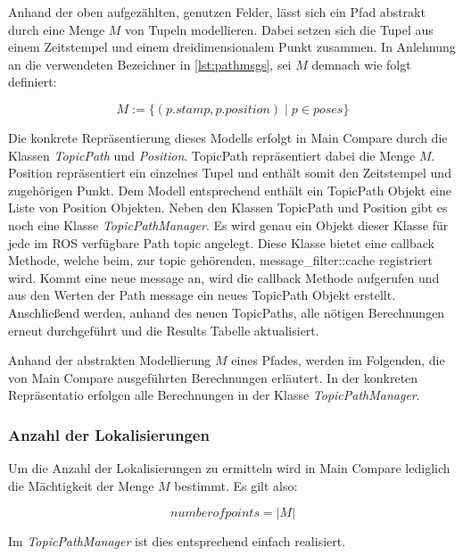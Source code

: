 Anhand der oben aufgezählten, genutzen Felder, lässt sich ein Pfad abstrakt durch eine Menge
$M$ von Tupeln modellieren. Dabei setzen sich die Tupel aus einem Zeitstempel und einem dreidimensionalem
Punkt zusammen. In Anlehnung an die verwendeten Bezeichner in
\autoref{lst:pathmsgs}, sei $M$ demnach wie folgt definiert:

\begin{equation*}
  \label{eqn:setdef}
  M := \{ (p.stamp , p.position) \mid p \in poses \}
\end{equation*}

Die konkrete Repräsentierung dieses Modells erfolgt in Main Compare durch die
Klassen \textit{TopicPath} und \textit{Position}. TopicPath repräsentiert dabei
die Menge $M$. Position repräsentiert ein einzelnes Tupel und enthält somit den
Zeitstempel und zugehörigen Punkt. Dem Modell entsprechend enthält ein
TopicPath Objekt eine Liste von Position Objekten.  Neben den Klassen TopicPath
und Position gibt es noch eine Klasse \textit{TopicPathManager}. Es wird genau
ein Objekt dieser Klasse für jede im ROS verfügbare Path topic angelegt. Diese
Klasse bietet eine callback Methode, welche beim, zur topic gehörenden,
message\_filter::cache registriert wird. Kommt eine neue message an, wird die
callback Methode aufgerufen und aus den Werten der Path message ein neues
TopicPath Objekt erstellt. Anschließend werden, anhand des neuen TopicPaths,
alle nötigen Berechnungen erneut durchgeführt und die Results Tabelle
aktualisiert.


Anhand der abstrakten Modellierung $M$ eines Pfades, werden im Folgenden, die von
Main Compare ausgeführten Berechnungen erläutert. In der konkreten
Repräsentatio erfolgen alle Berechnungen in der Klasse \textit{TopicPathManager}. 

\subsubsection{Anzahl der Lokalisierungen}
Um die Anzahl der Lokalisierungen zu ermitteln wird in Main Compare lediglich die
Mächtigkeit der Menge $M$ bestimmt. Es gilt also:

\begin{equation*}
  \label{eqn:numofpoints}
  number of points = \vert M \vert
\end{equation*}

Im \textit{TopicPathManager} ist dies entsprechend einfach realisiert.

